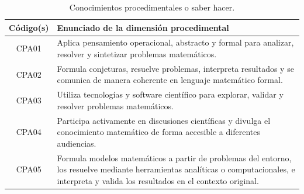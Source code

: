 \begin{table}[H]
\centering
\renewcommand{\arraystretch}{1.3}
\begin{tabular}{|c|p{9cm}|}
\hline
\cellcolor[HTML]{00C0F3}\textbf{Código(s)}  & \cellcolor[HTML]{00C0F3}\textbf{Enunciado de la dimensión procedimental} \\
\hline
CPA01 & Aplica pensamiento operacional, abstracto y formal para analizar, resolver y sintetizar problemas matemáticos. \\
\hline
CPA02 & Formula conjeturas, resuelve problemas, interpreta resultados y se comunica de manera coherente en lenguaje matemático formal. \\
\hline
CPA03 & Utiliza tecnologías y software científico para explorar, validar y resolver problemas matemáticos.\\
\hline
CPA04 & Participa activamente en discusiones científicas y divulga el conocimiento matemático de forma accesible a diferentes audiencias.\\
\hline
CPA05 & Formula modelos matemáticos a partir de problemas del entorno, los resuelve mediante herramientas analíticas o computacionales, e interpreta y valida los resultados en el contexto original.\\
\hline
\end{tabular}
\caption{Conocimientos procedimentales o saber hacer.}
\label{tab:procedimental-egreso-integrada}
\end{table}



